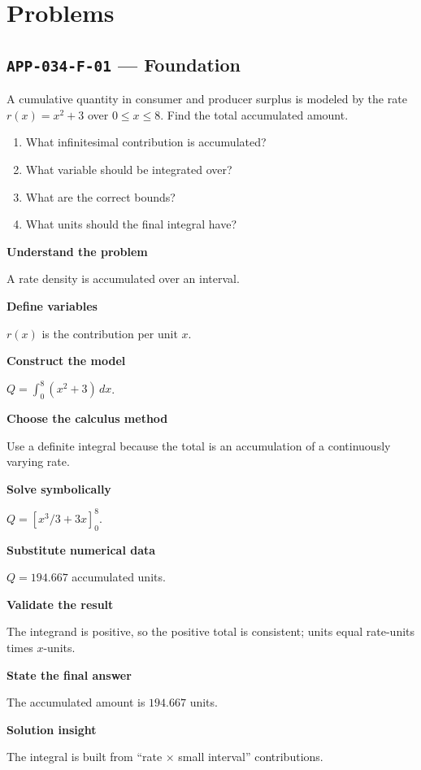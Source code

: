 \documentclass[11pt]{book}
\newcommand{\pid}[1]{\texttt{#1}}
\begin{document}
\section*{Problems}
\subsection*{\pid{APP-034-F-01} — Foundation}
\begin{problembox}
A cumulative quantity in consumer and producer surplus is modeled by the rate $r(x)=x^2+3$ over $0\le x\le 8$. Find the total accumulated amount.
\end{problembox}
\begin{promptbox}\begin{enumerate}
\item What infinitesimal contribution is accumulated?
\item What variable should be integrated over?
\item What are the correct bounds?
\item What units should the final integral have?
\end{enumerate}\end{promptbox}
\begin{solutionbox}
\textbf{Understand the problem}\par A rate density is accumulated over an interval.\par\medskip
\textbf{Define variables}\par $r(x)$ is the contribution per unit $x$.\par\medskip
\textbf{Construct the model}\par $Q=\int_0^{8}(x^2+3)\,dx$.\par\medskip
\textbf{Choose the calculus method}\par Use a definite integral because the total is an accumulation of a continuously varying rate.\par\medskip
\textbf{Solve symbolically}\par $Q=[x^3/3+3x]_0^{8}$.\par\medskip
\textbf{Substitute numerical data}\par $Q=194.667$ accumulated units.\par\medskip
\textbf{Validate the result}\par The integrand is positive, so the positive total is consistent; units equal rate-units times $x$-units.\par\medskip
\textbf{State the final answer}\par The accumulated amount is $194.667$ units.\par\medskip
\textbf{Solution insight}\par The integral is built from “rate × small interval” contributions.\par\medskip
\end{solutionbox}
\end{document}
